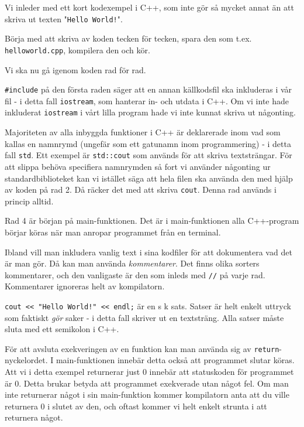Vi inleder med ett kort kodexempel i C++, som inte gör så mycket annat än att skriva ut texten "\texttt{Hello World!}".



Börja med att skriva av koden tecken för tecken, spara den som t.ex. \texttt{helloworld.cpp}, kompilera den och kör.

Vi ska nu gå igenom koden rad för rad.

\texttt{\#include} på den första raden säger att en annan källkodsfil ska inkluderas i vår fil - i detta fall \texttt{iostream}, som hanterar in- och utdata i C++. Om vi inte hade inkluderat \texttt{iostream} i vårt lilla program hade vi inte kunnat skriva ut någonting. 

Majoriteten av alla inbyggda funktioner i C++ är deklarerade inom vad som kallas en namnrymd (ungefär som ett gatunamn inom programmering) - i detta fall \texttt{std}. Ett exempel är \texttt{std::cout} som används för att skriva textsträngar. För att slippa behöva specifiera namnrymden så fort vi använder någonting ur standardbiblioteket kan vi istället säga att hela filen ska använda den med hjälp av koden på rad 2. Då räcker det med att skriva \texttt{cout}. Denna rad används i princip alltid.

Rad 4 är början på main-funktionen. Det är i main-funktionen alla C++-program börjar köras när man anropar programmet från en terminal.

Ibland vill man inkludera vanlig text i sina kodfiler för att dokumentera vad det är man gör. Då kan man använda \emph{kommentarer}. Det finns olika sorters kommentarer, och den vanligaste är den som inleds med \texttt{//} på varje rad. Kommentarer ignoreras helt av kompilatorn.

\texttt{cout << "Hello World!" << endl;} är en s k sats. Satser är helt enkelt uttryck som faktiskt \emph{gör} saker - i detta fall skriver ut en textsträng. Alla satser måste sluta med ett semikolon i C++.

För att avsluta exekveringen av en funktion kan man använda sig av \texttt{return}-nyckelordet. I main-funktionen innebär detta också att programmet slutar köras. Att vi i detta exempel returnerar just 0 innebär att statuskoden för programmet är 0. Detta brukar betyda att programmet exekverade utan något fel. Om man inte returnerar något i sin main-funktion kommer kompilatorn anta att du ville returnera 0 i slutet av den, och oftast kommer vi helt enkelt strunta i att returnera något.
